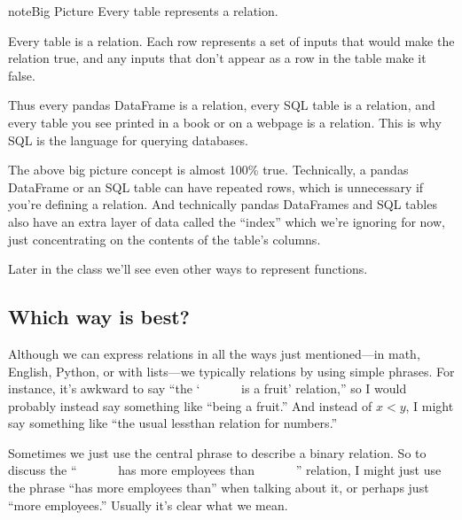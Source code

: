 \documentclass[letterpaper,10pt,english]{sphinxmanual}
\begin{document}
\begin{sphinxadmonition}{note}{Big Picture \sphinxhyphen{} Every table represents a relation.}

Every table is a relation.  Each row represents a set of inputs that would make the relation true, and any inputs that don’t appear as a row in the table make it false.

Thus every pandas DataFrame is a relation, every SQL table is a relation, and every table you see printed in a book or on a webpage is a relation.  This is why SQL is the language for querying  databases.
\end{sphinxadmonition}

The above big picture concept is almost 100\% true.  Technically, a pandas DataFrame or an SQL table can have repeated rows, which is unnecessary if you’re defining a relation.  And technically pandas DataFrames and SQL tables also have an extra layer of data called the “index” which we’re ignoring for now, just concentrating on the contents of the table’s columns.

 Later in the class we’ll see even other ways to represent functions.


\subsection{Which way is best?}
\label{\detokenize{chapter-2-mathematical-foundations:id1}}
Although we can express relations in all the ways just mentioned—in math, English, Python, or with lists—we typically  relations by using simple phrases.  For instance, it’s awkward to say “the ‘        is a fruit’ relation,” so I would probably instead say something like “being a fruit.”  And instead of \(x<y\), I might say something like “the usual less\sphinxhyphen{}than relation for numbers.”

Sometimes we just use the central phrase to describe a binary relation.  So to discuss the “        has more employees than        ” relation, I might just use the phrase “has more employees than” when talking about it, or perhaps just “more employees.”  Usually it’s clear what we mean.
\end{document}

